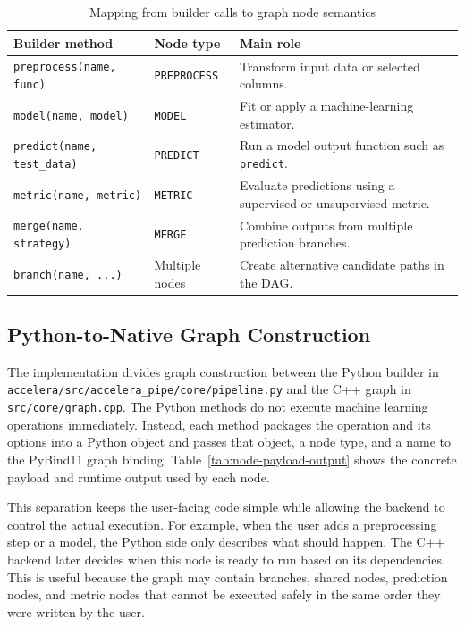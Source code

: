 \begin{table}[H]
\centering
\small
\renewcommand{\arraystretch}{1.15}
\setlength{\tabcolsep}{4pt}
\caption{Mapping from builder calls to graph node semantics}
\label{tab:accelera-pipe-builder-map}
\begin{tabularx}{\textwidth}{p{}p{}X}
\toprule
\textbf{Builder method} & \textbf{Node type} & \textbf{Main role} \\
\midrule
\texttt{preprocess(name, func)} &
\texttt{PREPROCESS} &
Transform input data or selected columns. \\
\midrule
\texttt{model(name, model)} &
\texttt{MODEL} &
Fit or apply a machine-learning estimator. \\
\midrule
\texttt{predict(name, test\_data)} &
\texttt{PREDICT} &
Run a model output function such as \texttt{predict}. \\
\midrule
\texttt{metric(name, metric)} &
\texttt{METRIC} &
Evaluate predictions using a supervised or unsupervised metric. \\
\midrule
\texttt{merge(name, strategy)} &
\texttt{MERGE} &
Combine outputs from multiple prediction branches. \\
\midrule
\texttt{branch(name, ...)} &
Multiple nodes &
Create alternative candidate paths in the DAG. \\
\bottomrule
\end{tabularx}
\end{table}

\subsection{Python-to-Native Graph Construction}

The implementation divides graph construction between the Python builder in
\texttt{accelera/src/accelera\_pipe/core/pipeline.py} and the C++ graph in
\texttt{src/core/graph.cpp}. The Python methods do not execute machine learning
operations immediately. Instead, each method packages the operation and its
options into a Python object and passes that object, a node type, and a name to
the PyBind11 graph binding. Table~\ref{tab:node-payload-output} shows the
concrete payload and runtime output used by each node.

This separation keeps the user-facing code simple while allowing the backend to
control the actual execution. For example, when the user adds a preprocessing
step or a model, the Python side only describes what should happen. The C++
backend later decides when this node is ready to run based on its dependencies.
This is useful because the graph may contain branches, shared nodes, prediction
nodes, and metric nodes that cannot be executed safely in the same order they
were written by the user.


